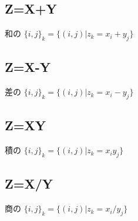 \documentclass[a4paper,11pt]{ltjsarticle}
\begin{document}
\subsection{Z=X+Y}
和の
$\{ i,j \}_k = \{ (i,j) | z_k = x_i + y_j \}$

\subsection{Z=X-Y}
差の
$\{ i,j \}_k = \{ (i,j) | z_k = x_i - y_j \}$

\subsection{Z=XY}
積の
$\{ i,j \}_k = \{ (i,j) | z_k = x_i y_j \}$

\subsection{Z=X/Y}
商の
$\{ i,j \}_k = \{ (i,j) | z_k = x_i / y_j \}$
\end{document}
